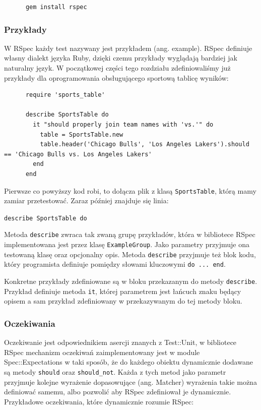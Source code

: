     \begin{verbatim}
      gem install rspec
    \end{verbatim}
    
    \subsubsection{Przykłady}
    W RSpec każdy test nazywany jest przykładem (ang. example). RSpec definiuje własny dialekt języka Ruby, dzięki czemu przykłady wyglądają bardziej jak naturalny język. W początkowej części tego rozdziału zdefiniowaliśmy już przykłady dla oprogramowania obsługującego sportową tablicę wyników:
    
    \begin{verbatim}
      require 'sports_table'

      describe SportsTable do
        it "should properly join team names with 'vs.'" do
          table = SportsTable.new
          table.header('Chicago Bulls', 'Los Angeles Lakers').should == 'Chicago Bulls vs. Los Angeles Lakers'
        end
      end
    \end{verbatim}
    
    Pierwsze co powyższy kod robi, to dołącza plik z klasą \verb+SportsTable+, którą mamy zamiar przetestować. Zaraz później znajduje się linia:
    
    \verb+describe SportsTable do+
    
    Metoda \verb+describe+ zwraca tak zwaną grupę przykładów, która w bibliotece RSpec implementowana jest przez klasę \verb+ExampleGroup+. Jako parametry przyjmuje ona testowaną klasę oraz opcjonalny opis. Metoda \verb+describe+ przyjmuje też blok kodu, który programista definiuje pomiędzy słowami kluczowymi \verb+do ... end+.
    
    Konkretne przykłady zdefiniowane są w bloku przekazanym do metody \verb+describe+. Przykład definiuje metoda \verb+it+, której parametrem jest łańcuch znaku będący opisem a sam przykład zdefiniowany w przekazywanym do tej metody bloku.
    
    \subsubsection{Oczekiwania}
    Oczekiwanie jest odpowiednikiem asercji znanych z Test::Unit, w bibliotece RSpec mechanizm oczekiwań zaimplementowany jest w module Spec::Expectations w taki sposób, że do każdego obiektu dynamicznie dodawane są metody \verb+should+ oraz \verb+should_not+. Każda z tych metod jako parametr przyjmuje kolejne wyrażenie dopasowujące (ang. Matcher) wyrażenia takie można definiować samemu, albo pozwolić aby RSpec zdefiniował je dynamicznie. Przykładowe oczekiwania, które dynamicznie rozumie RSpec:
    
